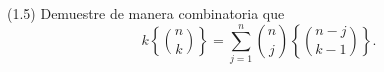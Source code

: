 
(1.5) Demuestre de manera combinatoria que
\[
  k\left\{\binom{n}{k}\right\}
  = \sum_{j=1}^{n} \binom{n}{j}\left\{\binom{n-j}{k-1}\right\}.
\]
